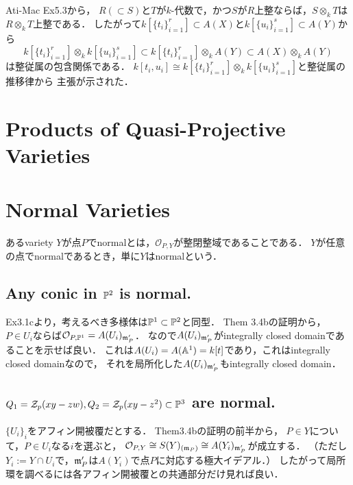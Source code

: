 \documentclass[a4paper]{jsarticle}
\begin{document}
    Ati-Mac Ex5.3から，
    $R (\subset S)$と$T$が$k$-代数で，かつ$S$が$R$上整ならば，$S \otimes_k T$は$R \otimes _k T$上整である．
    したがって$k[\{t_i\}_{i=1}^{r}] \subset A(X)$と$k[\{u_i\}_{i=1}^{s}] \subset A(Y)$から
    \[ k[\{t_i\}_{i=1}^{r}] \otimes_k k[\{u_i\}_{i=1}^{s}] \subset k[\{t_i\}_{i=1}^{r}] \otimes_k A(Y) \subset A(X) \otimes_k A(Y) \]
    は整従属の包含関係である．
    $k[t_i,u_i] \cong k[\{t_i\}_{i=1}^{r}] \otimes_k k[\{u_i\}_{i=1}^{s}]$と整従属の推移律から
    主張が示された．

\section{Products of Quasi-Projective Varieties} 

\section{Normal Varieties}
    あるvariety $Y$が点$P$でnormalとは，$\mathcal{O}_{P,Y}$が整閉整域であることである．
    $Y$が任意の点でnormalであるとき，単に$Y$はnormalという．

    \subsection{Any conic in $\mathbb{P}^2$ is normal.}
    Ex3.1cより，考えるべき多様体は$\mathbb{P}^1 \subset \mathbb{P}^2$と同型．
    Them 3.4bの証明から，$P \in U_i$ならば$\mathcal{O}_{P,\mathbb{P}^1}=A(U_i)_{\mathfrak{m}'_P}$．
    なので$A(U_i)_{\mathfrak{m}'_P}$がintegrally closed domainであることを示せば良い．
    これは$A(U_i)=A(\mathbb{A}^1)=k[t]$であり，これはintegrally closed domainなので，
    それを局所化した$A(U_i)_{\mathfrak{m}'_P}$もintegrally closed domain．


    \subsection{$Q_1=\mathcal{Z}_p(xy-zw), Q_2=\mathcal{Z}_p(xy-z^2) \subset \mathbb{P}^3$ are normal.}
    $\{U_i\}_i$をアフィン開被覆だとする．
    Them3.4bの証明の前半から，
    $P \in Y$について，$P \in U_i$なる$i$を選ぶと，
    $\mathcal{O}_{P,Y} \cong S(Y)_{(\mathfrak{m}_P)} \cong A(Y_i)_{\mathfrak{m}'_P}$が成立する．
    （ただし$Y_i:=Y \cap U_i$で，$\mathfrak{m}'_P$は$A(Y_i)$で点$P$に対応する極大イデアル．）
    したがって局所環を調べるには各アフィン開被覆との共通部分だけ見れば良い．
\end{document}
